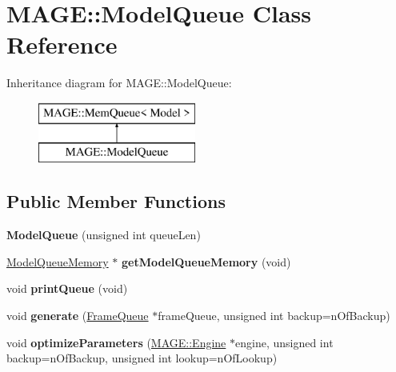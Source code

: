 \hypertarget{class_m_a_g_e_1_1_model_queue}{\section{M\-A\-G\-E\-:\-:Model\-Queue Class Reference}
\label{class_m_a_g_e_1_1_model_queue}
}
Inheritance diagram for M\-A\-G\-E\-:\-:Model\-Queue\-:\begin{figure}[H]
\begin{center}
\leavevmode
\includegraphics[height=2.000000cm]{class_m_a_g_e_1_1_model_queue}
\end{center}
\end{figure}
\subsection*{Public Member Functions}
\begin{DoxyCompactItemize}
\item 
\hypertarget{class_m_a_g_e_1_1_model_queue_a03f786d7dc7e7adad25216f8ec83752d}{{\bfseries Model\-Queue} (unsigned int queue\-Len)}\label{class_m_a_g_e_1_1_model_queue_a03f786d7dc7e7adad25216f8ec83752d}

\item 
\hypertarget{class_m_a_g_e_1_1_model_queue_ab1f2f92109e6fca56b51be0ead9b105d}{\hyperlink{class_m_a_g_e_1_1_model_queue_memory}{Model\-Queue\-Memory} $\ast$ {\bfseries get\-Model\-Queue\-Memory} (void)}\label{class_m_a_g_e_1_1_model_queue_ab1f2f92109e6fca56b51be0ead9b105d}

\item 
\hypertarget{class_m_a_g_e_1_1_model_queue_a566cc6d3e8f6e50a54da65f185592629}{void {\bfseries print\-Queue} (void)}\label{class_m_a_g_e_1_1_model_queue_a566cc6d3e8f6e50a54da65f185592629}

\item 
\hypertarget{class_m_a_g_e_1_1_model_queue_a6592defce9e72de3cfc266ae5e52e86d}{void {\bfseries generate} (\hyperlink{class_m_a_g_e_1_1_frame_queue}{Frame\-Queue} $\ast$frame\-Queue, unsigned int backup=n\-Of\-Backup)}\label{class_m_a_g_e_1_1_model_queue_a6592defce9e72de3cfc266ae5e52e86d}

\item 
\hypertarget{class_m_a_g_e_1_1_model_queue_a6c76b6ddff10f8caa21fc454325d3b77}{void {\bfseries optimize\-Parameters} (\hyperlink{class_m_a_g_e_1_1_engine}{M\-A\-G\-E\-::\-Engine} $\ast$engine, unsigned int backup=n\-Of\-Backup, unsigned int lookup=n\-Of\-Lookup)}\label{class_m_a_g_e_1_1_model_queue_a6c76b6ddff10f8caa21fc454325d3b77}

\end{DoxyCompactItemize}

